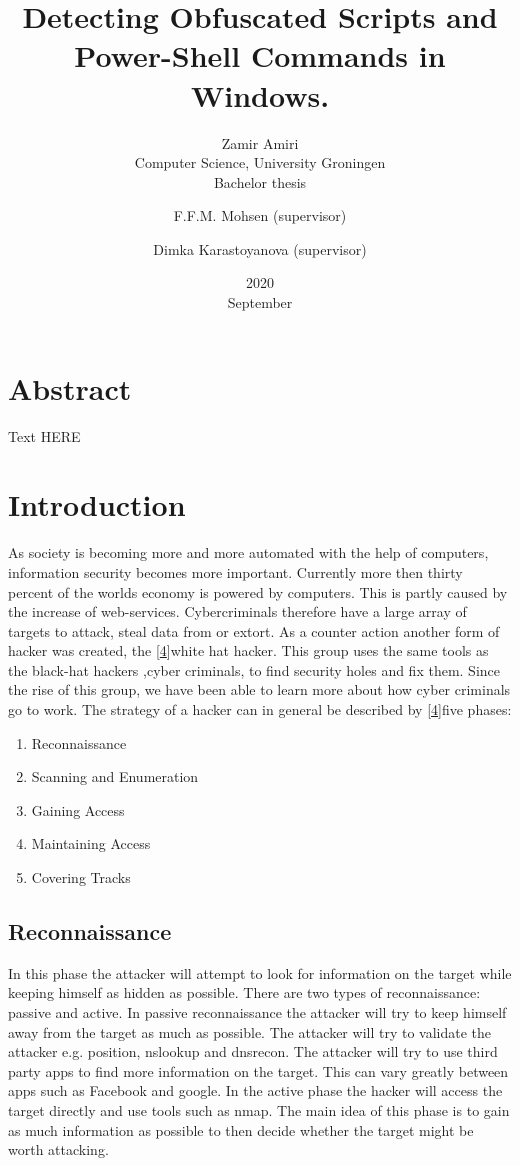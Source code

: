 \documentclass{article}%
\title{Detecting Obfuscated Scripts and Power-Shell Commands in Windows.}
\date{2020\\ September}
\author{Zamir Amiri\\ Computer Science, University Groningen 
\\Bachelor thesis
\and F.F.M. Mohsen (supervisor)
\and Dimka Karastoyanova (supervisor)
}
\begin{document}
\maketitle
\section*{Abstract}
{Text HERE}
\newpage
\tableofcontents
\newpage
\section{Introduction}
As society is becoming more and more automated with the help of computers, information security becomes more important. Currently more then thirty percent of the worlds economy is powered by computers. This is partly caused by the increase of web-services. Cybercriminals therefore have a large array of targets to attack, steal data from or extort. As a counter action another form of hacker was created, the [\hyperlink{4}{4}]white hat hacker. This group uses the same tools as the black-hat hackers ,cyber criminals, to find security holes and fix them. Since the rise of this group, we have been able to learn more about how cyber criminals go to work. The strategy of a hacker can in general be described by [\hyperlink{4}{4}]five phases:
\begin{enumerate}
  \item Reconnaissance
  \item Scanning and Enumeration
  \item Gaining Access
  \item Maintaining Access
  \item Covering Tracks
\end{enumerate}
\subsection{Reconnaissance}
In this phase the attacker will attempt to look for information on the target while keeping himself as hidden as possible. There are two types of reconnaissance: passive and active. In passive reconnaissance the attacker will try to keep himself away from the target as much as possible. The attacker will try to validate the attacker e.g. position, nslookup and dnsrecon. The attacker will try to use third party apps to find more information on the target. This can vary greatly between apps such as Facebook and google. In the active phase the hacker will access the target directly and use tools such as nmap. The main idea of this phase is to gain as much information as possible to then decide whether the target might be worth attacking.
\end{document}
